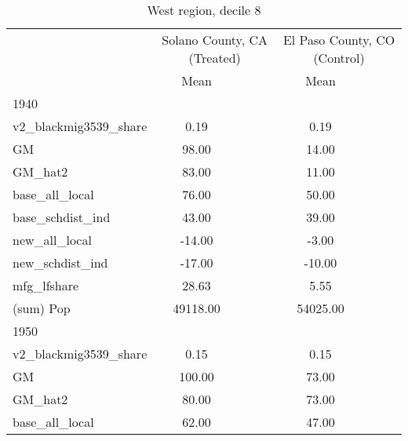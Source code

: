 \begin{table}[htbp]\centering
\def\sym#1{\ifmmode^{#1}\else\(^{#1}\)\fi}
\caption{West region, decile 8 \label{tab1}}
\begin{tabular}{l*{2}{ccc}}
\toprule
                    &\multicolumn{3}{c}{Solano County, CA (Treated)}&\multicolumn{3}{c}{El Paso County, CO (Control)}\\
                    &        Mean&            &            &        Mean&            &            \\
\midrule
1940                &            &            &            &            &            &            \\
v2\_blackmig3539\_share&        0.19&            &            &        0.19&            &            \\
GM                  &       98.00&            &            &       14.00&            &            \\
GM\_hat2             &       83.00&            &            &       11.00&            &            \\
base\_all\_local      &       76.00&            &            &       50.00&            &            \\
base\_schdist\_ind    &       43.00&            &            &       39.00&            &            \\
new\_all\_local       &      -14.00&            &            &       -3.00&            &            \\
new\_schdist\_ind     &      -17.00&            &            &      -10.00&            &            \\
mfg\_lfshare         &       28.63&            &            &        5.55&            &            \\
(sum) Pop           &    49118.00&            &            &    54025.00&            &            \\
\midrule
1950                &            &            &            &            &            &            \\
v2\_blackmig3539\_share&        0.15&            &            &        0.15&            &            \\
GM                  &      100.00&            &            &       73.00&            &            \\
GM\_hat2             &       80.00&            &            &       73.00&            &            \\
base\_all\_local      &       62.00&            &            &       47.00&            &            \\

\end{tabular}
\end{table}
